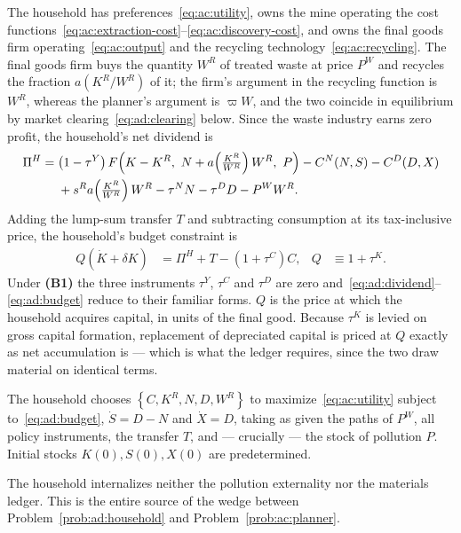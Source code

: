 The household has preferences~\eqref{eq:ac:utility}, owns the mine operating the cost functions~\eqref{eq:ac:extraction-cost}--\eqref{eq:ac:discovery-cost}, and owns the final goods firm operating~\eqref{eq:ac:output} and the recycling technology~\eqref{eq:ac:recycling}. The final goods firm buys the quantity $W^R$ of treated waste at price $P^W$ and recycles the fraction $a\!\left(K^R/W^R\right)$ of it; the firm's argument in the recycling function is $W^R$, whereas the planner's argument is $\varpi W$, and the two coincide in equilibrium by market clearing~\eqref{eq:ad:clearing} below. Since the waste industry earns zero profit, the household's net dividend is
\begin{align}
\Pi^H &= \left(1-\tau^Y\right)F\!\left(K-K^R,\ N+a\!\left(\tfrac{K^R}{W^R}\right)W^R,\ P\right)-C^N(N,S)-C^D(D,X)
\notag \\
&\phantom{{}={}}
+s^R a\!\left(\tfrac{K^R}{W^R}\right)W^R-\tau^NN-\tau^DD-P^WW^R.
\label{eq:ad:dividend}
\end{align}
Adding the lump-sum transfer $T$ and subtracting consumption at its tax-inclusive price, the household's budget constraint is
\begin{align}
Q\left(\dot K+\delta K\right) &= \Pi^H+T-\left(1+\tau^C\right)C,
&
Q &\equiv 1+\tau^K.
\label{eq:ad:budget}
\end{align}
Under \textbf{(B1)} the three instruments $\tau^Y$, $\tau^C$ and $\tau^D$ are zero and~\eqref{eq:ad:dividend}--\eqref{eq:ad:budget} reduce to their familiar forms.
$Q$ is the price at which the household acquires capital, in units of the final good. Because $\tau^K$ is levied on gross capital formation, replacement of depreciated capital is priced at $Q$ exactly as net accumulation is --- which is what the ledger requires, since the two draw material on identical terms.

\begin{problem}[Household]\label{prob:ad:household}
The household chooses $\left\{C,K^R,N,D,W^R\right\}$ to maximize~\eqref{eq:ac:utility} subject to~\eqref{eq:ad:budget}, $\dot S=D-N$ and $\dot X=D$, taking as given the paths of $P^W$, all policy instruments, the transfer $T$, and --- crucially --- the stock of pollution $P$. Initial stocks $K(0),S(0),X(0)$ are predetermined.
\end{problem}

The household internalizes neither the pollution externality nor the materials ledger. This is the entire source of the wedge between Problem~\ref{prob:ad:household} and Problem~\ref{prob:ac:planner}.


